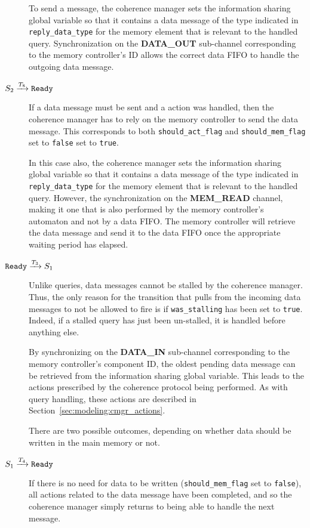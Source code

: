 \begin{description}
   To send a message, the coherence manager sets the information sharing global
   variable so that it contains a data message of the type indicated in
   \lstinline!reply_data_type! for the memory element that is relevant to the
   handled query. Synchronization on the \textbf{DATA\_OUT} sub-channel
   corresponding to the memory controller's ID allows the correct data FIFO to
   handle the outgoing data message.

\item[$S_2 \xrightarrow[]{T_{8}} \texttt{Ready}$]
   If a data message must be sent and a \readact{} action was handled, then
   the coherence manager has to rely on the memory controller to send the data
   message. This corresponds to both \lstinline!should_act_flag! and
   \lstinline!should_mem_flag! set to \lstinline!false! set to \lstinline!true!.

   In this case also, the coherence manager sets the information sharing global
   variable so that it contains a data message of the type indicated in
   \lstinline!reply_data_type! for the memory element that is relevant to the
   handled query. However, the synchronization on the \textbf{MEM\_READ}
   channel, making it one that is also performed by the memory controller's
   automaton and not by a data FIFO. The memory controller will retrieve the
   data message and send it to the data FIFO once the appropriate waiting
   period has elapsed.

\item[$\texttt{Ready} \xrightarrow[]{T_{3}} S_1$]
   Unlike queries, data messages cannot be stalled by the coherence manager.
   Thus, the only reason for the transition that pulls from the incoming data
   messages to not be allowed to fire is if \lstinline!was_stalling! has been
   set to \lstinline!true!. Indeed, if a stalled query has just been un-stalled,
   it is handled before anything else.

   By synchronizing on the \textbf{DATA\_IN} sub-channel corresponding to the
   memory controller's component ID, the oldest pending data message can be
   retrieved from the information sharing global variable. This leads to the
   actions prescribed by the coherence protocol being performed. As with query
   handling, these actions are described in
   Section~\ref{sec:modeling:cmgr_actions}.

   There are two possible outcomes, depending on whether data should be written
   in the main memory or not.

\item[$S_1 \xrightarrow[]{T_{4}} \texttt{Ready}$]
   If there is no need for data to be written (\lstinline!should_mem_flag! set
   to \lstinline!false!), all actions related to the data message have been
   completed, and so the coherence manager simply returns to being able to
   handle the next message.


\end{description}
